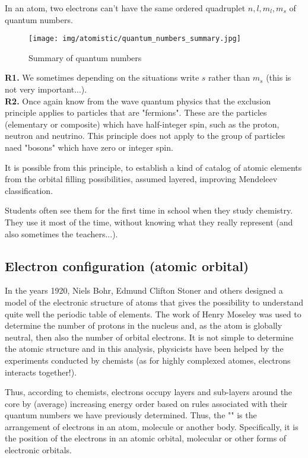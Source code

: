	In an atom, two electrons can't have the same ordered quadruplet $n,l,m_l,m_s$ of quantum numbers.
	\begin{figure}[H]
		\centering
		\texttt{[image: img/atomistic/quantum\_numbers\_summary.jpg]}
		\caption{Summary of quantum numbers}
	\end{figure}
	\begin{tcolorbox}[title=Remarks,colframe=black,arc=10pt]
	\textbf{R1.} We sometimes depending on the situations write $s$ rather than $m_s$ (this is not very important...).\\
	
	\textbf{R2.} Once again know from the wave quantum physics that the exclusion principle applies to particles that are "fermions". These are the particles (elementary or composite) which have half-integer spin, such as the proton, neutron and neutrino. This principle does not apply to the group of particles naed "bosons" which have zero or integer spin.
	\end{tcolorbox}
	It is possible from this principle, to establish a kind of catalog of atomic elements from the orbital filling possibilities, assumed layered, improving Mendeleev classification.

	Students often see them for the first time in school when they study chemistry. They use it most of the time, without knowing what they really represent (and also sometimes the teachers...).
	
	\subsection{Electron configuration (atomic orbital)}
	In the years 1920, Niels Bohr, Edmund Clifton Stoner and others designed a model of the electronic structure of atoms that gives the possibility to understand quite well the periodic table of elements. The work of Henry Moseley was used to determine the number of protons in the nucleus and, as the atom is globally neutral, then also the number of orbital electrons. It is not simple to determine the atomic structure and in this analysis, physicists have been helped by the experiments conducted by chemists (as for highly complexed atomes, electrons interacts together!).

	Thus, according to chemists, electrons occupy layers and sub-layers around the core by (average) increasing energy order based on rules associated with their quantum numbers we have previously determined. Thus, the "" is the arrangement of electrons in an atom, molecule or another body. Specifically, it is the position of the electrons in an atomic orbital, molecular or other forms of electronic orbitals.
	
